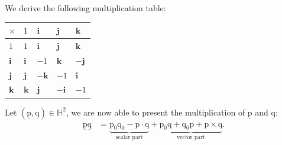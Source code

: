\noindent We derive the following multiplication table:

\begin{center}
\setlength{\arrayrulewidth}{1pt}
\renewcommand{\arraystretch}{1.2}
\begin{tabular}{|m{1.5em}||m{1.5em}|m{1.5em}|m{1.5em}|m{1.5em}|}
    \hline
    \rowcolor{gray!25}
    \cellcolor{gray!60}$\times$ & \centering $1$ & \centering $\bm{i}$ & \centering $\bm{j}$ & \centering $\bm{k}$ \tabularnewline
    \hline\hline
    \cellcolor{gray!25}$1$ & \centering $1$ & \centering $\bm{i}$ & \centering $\bm{j}$ & \centering $\bm{k}$ \tabularnewline
    \hline
    \cellcolor{gray!25}$\bm{i}$ & \centering $\bm{i}$ & \centering $-1$ & \centering $\bm{k}$ & \centering $-\bm{j}$ \tabularnewline
    \hline
    \cellcolor{gray!25}$\bm{j}$ & \centering $\bm{j}$ & \centering $-\bm{k}$ & \centering $-1$ & \centering $\bm{i}$ \tabularnewline
    \hline
    \cellcolor{gray!25}$\bm{k}$ & \centering $\bm{k}$ & \centering $\bm{j}$ & \centering $-\bm{i}$ & \centering $-1$ \tabularnewline
    \hline
\end{tabular}
\end{center}


\bigbreak 

\noindent Let $(\underline{\bm{\mathrm{p}}}, \underline{\bm{\mathrm{q}}})\in\mathbb{H}^2$, we are now able to present the multiplication of $\underline{\bm{\mathrm{p}}}$ and $\underline{\bm{\mathrm{q}}}$:
\begin{align*}
    \underline{\bm{\mathrm{p}}}\underline{\bm{\mathrm{q}}} &= \underbrace{\mathrm{p}_0\mathrm{q}_0 - \bm{\mathrm{p}} \cdot \bm{\mathrm{q}}}_{\text{scalar part}} + \underbrace{\mathrm{p}_0\bm{\mathrm{q}} + \mathrm{q}_0\bm{\mathrm{p}} + \bm{\mathrm{p}} \times \bm{\mathrm{q}}}_{\text{vector part}}.
\end{align*}

